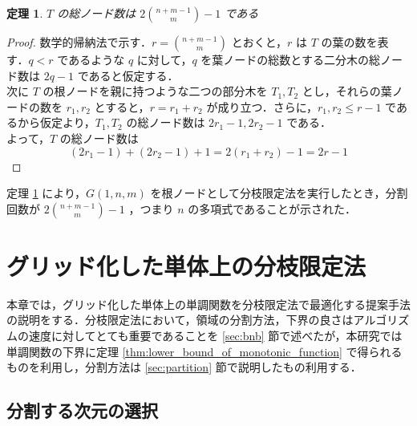 \documentclass[a4paper,11pt]{jreport}
\newtheorem{theorem}{定理}
\begin{document}
\begin{theorem} \label{thm:total_node}
$ T $ の総ノード数は $ 2 \binom{n + m - 1}{m} - 1 $ である
\end{theorem}
\begin{proof}
数学的帰納法で示す．$ r = \binom{n + m - 1}{m} $ とおくと，$ r $ は $ T $ の葉の数を表す．$ q < r $ であるような $ q $ に対して，$ q $ を葉ノードの総数とする二分木の総ノード数は $ 2q - 1 $ であると仮定する．\\
次に $ T $ の根ノードを親に持つような二つの部分木を $ T_1, T_2 $ とし，それらの葉ノードの数を $ r_1, r_2 $ とすると，$ r = r_1 + r_2 $ が成り立つ．さらに，$ r_1, r_2 \leq r - 1 $ であるから仮定より，$ T_1, T_2 $ の総ノード数は $ 2r_1 - 1, 2r_2 - 1 $ である．\\
よって，$ T $ の総ノード数は
$$ (2r_1 - 1) + (2r_2 - 1) + 1 = 2(r_1 + r_2) - 1 = 2r - 1 $$
\end{proof}

定理 \ref{thm:total_node} により，$ G(1, n, m) $ を根ノードとして分枝限定法を実行したとき，分割回数が $ 2 \binom{n + m - 1}{m} - 1 $ ，つまり $ n $ の多項式であることが示された．

\chapter{グリッド化した単体上の分枝限定法}

本章では，グリッド化した単体上の単調関数を分枝限定法で最適化する提案手法の説明をする．分枝限定法において，領域の分割方法，下界の良さはアルゴリズムの速度に対してとても重要であることを \ref{sec:bnb} 節で述べたが，本研究では単調関数の下界に定理  \ref{thm:lower_bound_of_monotonic_function} で得られるものを利用し，分割方法は \ref{sec:partition} 節で説明したもの利用する．\par

\section{分割する次元の選択}
\end{document}
